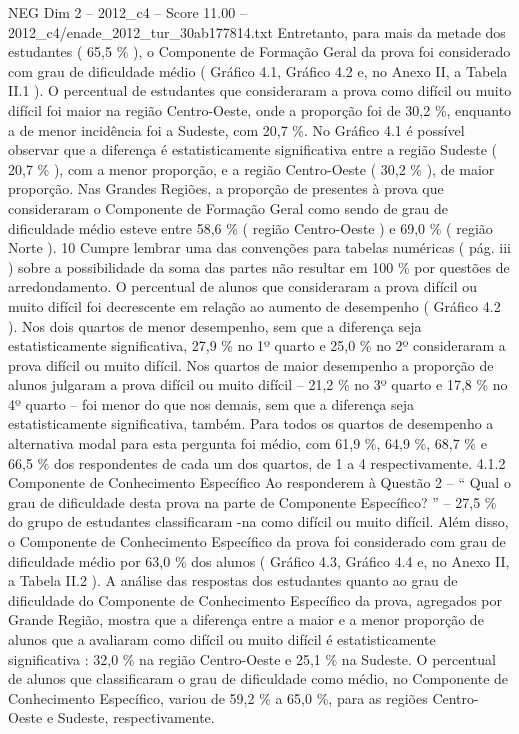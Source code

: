 \begin{textsample}{NEG Dim 2 – 2012\_c4 – Score 11.00 – 2012\_c4/enade\_2012\_tur\_30ab177814.txt}
Entretanto, para mais da metade dos estudantes ( 65,5 \% ), o Componente de Formação Geral da prova foi considerado com grau de dificuldade médio ( Gráfico 4.1, Gráfico 4.2 e, no Anexo II, a Tabela II.1 ).
O percentual de estudantes que consideraram a prova como difícil ou muito difícil foi maior na região Centro-Oeste, onde a proporção foi de 30,2 \%, enquanto a de menor incidência foi a Sudeste, com 20,7 \%.
No Gráfico 4.1 é possível observar que a diferença é estatisticamente significativa entre a região Sudeste ( 20,7 \% ), com a menor proporção, e a região Centro-Oeste ( 30,2 \% ), de maior proporção.
Nas Grandes Regiões, a proporção de presentes à prova que consideraram o Componente de Formação Geral como sendo de grau de dificuldade médio esteve entre 58,6 \% ( região Centro-Oeste ) e 69,0 \% ( região Norte ). 10 Cumpre lembrar uma das convenções para tabelas numéricas ( pág. iii ) sobre a possibilidade da soma das partes não resultar em 100 \% por questões de arredondamento.
O percentual de alunos que consideraram a prova difícil ou muito difícil foi decrescente em relação ao aumento de desempenho ( Gráfico 4.2 ).
Nos dois quartos de menor desempenho, sem que a diferença seja estatisticamente significativa, 27,9 \% no 1º quarto e 25,0 \% no 2º consideraram a prova difícil ou muito difícil.
Nos quartos de maior desempenho a proporção de alunos julgaram a prova difícil ou muito difícil – 21,2 \% no 3º quarto e 17,8 \% no 4º quarto – foi menor do que nos demais, sem que a diferença seja estatisticamente significativa, também.
Para todos os quartos de desempenho a alternativa modal para esta pergunta foi médio, com 61,9 \%, 64,9 \%, 68,7 \% e 66,5 \% dos respondentes de cada um dos quartos, de 1 a 4 respectivamente. 4.1.2 Componente de Conhecimento Específico Ao responderem à Questão 2 – “ Qual o grau de dificuldade desta prova na parte de Componente Específico? ” – 27,5 \% do grupo de estudantes classificaram -na como difícil ou muito difícil.
Além disso, o Componente de Conhecimento Específico da prova foi considerado com grau de dificuldade médio por 63,0 \% dos alunos ( Gráfico 4.3, Gráfico 4.4 e, no Anexo II, a Tabela II.2 ).
A análise das respostas dos estudantes quanto ao grau de dificuldade do Componente de Conhecimento Específico da prova, agregados por Grande Região, mostra que a diferença entre a maior e a menor proporção de alunos que a avaliaram como difícil ou muito difícil é estatisticamente significativa : 32,0 \% na região Centro-Oeste e 25,1 \% na Sudeste.
O percentual de alunos que classificaram o grau de dificuldade como médio, no Componente de Conhecimento Específico, variou de 59,2 \% a 65,0 \%, para as regiões Centro-Oeste e Sudeste, respectivamente.

\end{textsample}
